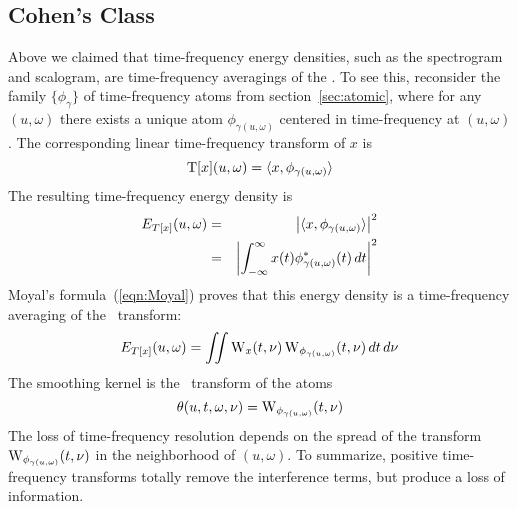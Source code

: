{\subsection{Cohen's Class\protect\footnotemark}
}
Above we claimed that time-frequency energy densities,
such as the spectrogram and scalogram, are time-frequency averagings
of the \WT. To see this, reconsider the family $\{\phi_{\gamma}\}$  
of time-frequency atoms from section~\ref{sec:atomic}, where for any
$(u,\omega)$ there exists a unique atom $\phi_{\gamma(u,\omega)}$
centered in time-frequency at $(u,\omega)$. The corresponding linear
time-frequency transform of $x$ is 
\[
\operatorname{T}[x](u,\omega) =\langle x,\phi_{\gamma(u,\omega)} \rangle
\]
The resulting time-frequency energy density is
\begin{eqnarray*}
E_{T[x]}(u,\omega)&
  =&\left|\langle x,\phi_{\gamma(u,\omega)}\rangle\right|^2 \\
 &=& \left|\int_{-\infty}^{\infty} x(t) \phi^*_{\gamma(u,\omega)}(t)\,dt\right|^2
\end{eqnarray*}
Moyal's formula~(\ref{eqn:Moyal}) proves that this energy density is a
time-frequency averaging of the \WV\ transform:
\[
E_{T[x]}(u,\omega)= %
\iint \W_x(t,\nu)\W_{\phi_{\gamma(u,\omega)}}(t,\nu)\,dt\,d\nu
\]
The smoothing kernel is the \WV\ transform of the atoms
\[\theta(u,t,\omega,\nu) =
\operatorname{W}_{\phi_{\gamma(u,\omega)}}(t,\nu)\]
The loss of time-frequency resolution depends on the spread of the
transform $\operatorname{W}_{\phi_{\gamma(u,\omega)}}(t,\nu)$ in the neighborhood of
$(u,\omega)$. To summarize, positive time-frequency transforms totally
remove the interference terms, but produce a loss of information.

